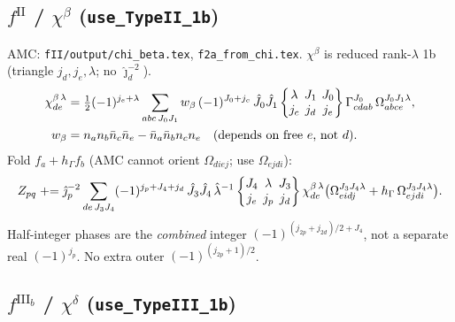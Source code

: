 \documentclass[enabledeprecatedfontcommands]{scrartcl}
\newcommand{\codename}[1]{\texttt{#1}}
\newcommand{\sixj}[6]{\begingroup\setlength{\arraycolsep}{0.2em}%
  \begin{Bmatrix} #1 & #2 & #3 \\ #4 & #5 & #6 \end{Bmatrix}\endgroup}
\begin{document}
\subsection{$f^{\mathrm{II}}$ / $\chi^\beta$
(\codename{use\_TypeII\_1b})}
\label{sec:js-fII}

AMC: \codename{fII/output/chi\_beta.tex},
\codename{f2a\_from\_chi.tex}. $\chi^\beta$ is reduced rank-$\lambda$ 1b
(triangle $j_d,j_e,\lambda$; no $\hat\jmath_d^{-2}$).
\begin{equation}\label{eq:js-chib}
\begin{aligned}
\chi^{\beta\,\lambda}_{de}
&=\tfrac12(-1)^{j_e+\lambda}
\sum_{abc\,J_0 J_1}
w_\beta\,(-1)^{J_0+j_c}\,
\hat J_0\hat J_1
\sixj{\lambda}{J_1}{J_0}{j_c}{j_d}{j_e}
\Gamma^{J_0}_{cdab}\,
\Omega^{J_0 J_1\lambda}_{abce},\\
w_\beta
&=n_a n_b\bar n_c\bar n_e-\bar n_a\bar n_b n_c n_e
\quad\text{(depends on free $e$, not $d$)}.
\end{aligned}
\end{equation}
Fold $f_a+h_\Gamma f_b$ (AMC cannot orient $\Omega_{diej}$; use
$\Omega_{ejdi}$):
\begin{equation}\label{eq:js-fII}
\begin{aligned}
Z_{pq}
\mathrel{+}=
\hat\jmath_p^{-2}
\sum_{de\,J_3 J_4}
(-1)^{j_p+J_4+j_d}\,
\hat J_3\hat J_4\,\hat\lambda^{-1}
\sixj{J_4}{\lambda}{J_3}{j_e}{j_p}{j_d}
\chi^{\beta\,\lambda}_{de}
\bigl(\Omega^{J_3 J_4\lambda}_{eidj}
+h_\Gamma\,\Omega^{J_3 J_4\lambda}_{ejdi}\bigr).
\end{aligned}
\end{equation}
Half-integer phases are the \emph{combined} integer
$(-1)^{(j_{2p}+j_{2d})/2+J_4}$, not a separate real $(-1)^{j_p}$.
No extra outer $(-1)^{(j_{2p}+1)/2}$.

\subsection{$f^{\mathrm{III}_b}$ / $\chi^\delta$
(\codename{use\_TypeIII\_1b})}
\label{sec:js-fIIIb}
\end{document}
